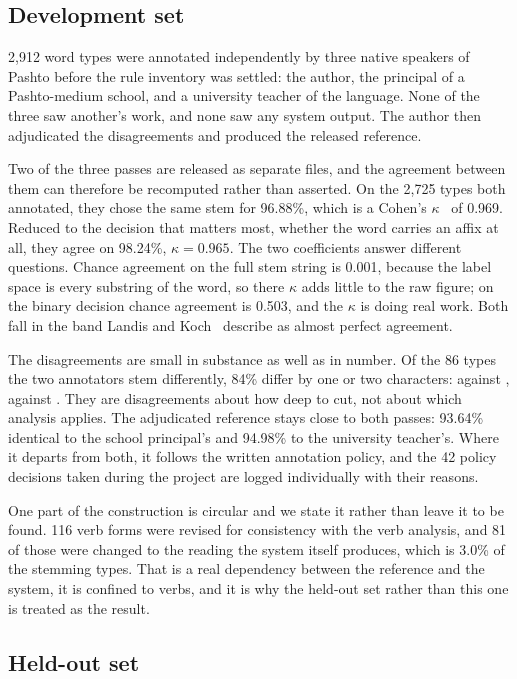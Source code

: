 \documentclass[conference]{IEEEtran}
\newcommand{\ps}[1]{{\pashtofont\textpashto{#1}}}
\begin{document}
\subsection{Development set}
\label{sec:devset}

2{,}912 word types were annotated independently by three native speakers of
Pashto before the rule inventory was settled: the author, the principal of a
Pashto-medium school, and a university teacher of the language. None of the
three saw another's work, and none saw any system output. The author then
adjudicated the disagreements and produced the released reference.

Two of the three passes are released as separate files, and the agreement
between them can therefore be recomputed rather than asserted. On the 2{,}725
types both annotated, they chose the same stem for 96.88\%, which is a Cohen's
$\kappa$~\cite{cohen1960} of 0.969. Reduced to the decision that matters most, whether the word
carries an affix at all, they agree on 98.24\%, $\kappa = 0.965$. The two
coefficients answer different questions. Chance agreement on the full stem
string is 0.001, because the label space is every substring of the word, so
there $\kappa$ adds little to the raw figure; on the binary decision chance
agreement is 0.503, and the $\kappa$ is doing real work. Both fall in the band
Landis and Koch~\cite{landis1977} describe as almost perfect agreement.

The disagreements are small in substance as well as in number. Of the 86 types
the two annotators stem differently, 84\% differ by one or two characters:
\ps{مرست} against \ps{مرس}, \ps{خون} against \ps{خو}. They are disagreements
about how deep to cut, not about which analysis applies. The adjudicated
reference stays close to both passes: 93.64\% identical to the school
principal's and 94.98\% to the university teacher's. Where it departs from
both, it follows the written annotation policy, and the 42 policy decisions
taken during the project are logged individually with their reasons.

One part of the construction is circular and we state it rather than leave it to
be found. 116 verb forms were revised for consistency with the verb analysis,
and 81 of those were changed to the reading the system itself produces, which is
3.0\% of the stemming types. That is a real dependency between the reference and
the system, it is confined to verbs, and it is why the held-out set rather than
this one is treated as the result.

\subsection{Held-out set}
\end{document}
